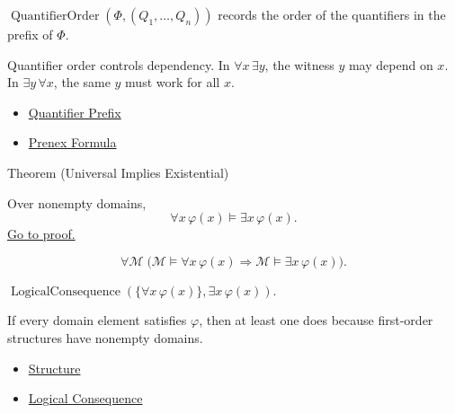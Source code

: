 \begin{remark*}
\(\operatorname{QuantifierOrder}(\Phi,(Q_1,\ldots,Q_n))\) records the order of
the quantifiers in the prefix of \(\Phi\).
\end{remark*}

\begin{remark*}[Interpretation]
Quantifier order controls dependency. In \(\forall x\,\exists y\), the witness
\(y\) may depend on \(x\). In \(\exists y\,\forall x\), the same \(y\) must work
for all \(x\).
\end{remark*}

\begin{dependencies}
\begin{itemize}
  \item \hyperref[def:quantifier-prefix]{Quantifier Prefix}
  \item \hyperref[def:prenex-formula]{Prenex Formula}
\end{itemize}
\end{dependencies}

\begin{theorembox}{Theorem (Universal Implies Existential)}
\begin{theorem}
\label{thm:universal-implies-existential}
Over nonempty domains,
\[
\forall x\,\varphi(x)\models \exists x\,\varphi(x).
\]
\hyperref[prf:universal-implies-existential]{Go to proof.}
\end{theorem}
\end{theorembox}

\begin{remark*}
\[
\forall \mathcal M\;
\bigl(\mathcal M\models\forall x\,\varphi(x)
\Rightarrow
\mathcal M\models\exists x\,\varphi(x)\bigr).
\]
\end{remark*}

\begin{remark*}
\(\operatorname{LogicalConsequence}(\{\forall x\,\varphi(x)\},\exists x\,\varphi(x))\).
\end{remark*}

\begin{remark*}[Interpretation]
If every domain element satisfies \(\varphi\), then at least one does because
first-order structures have nonempty domains.
\end{remark*}

\begin{dependencies}
\begin{itemize}
  \item \hyperref[def:structure]{Structure}
  \item \hyperref[def:log-consequence]{Logical Consequence}
\end{itemize}
\end{dependencies}

